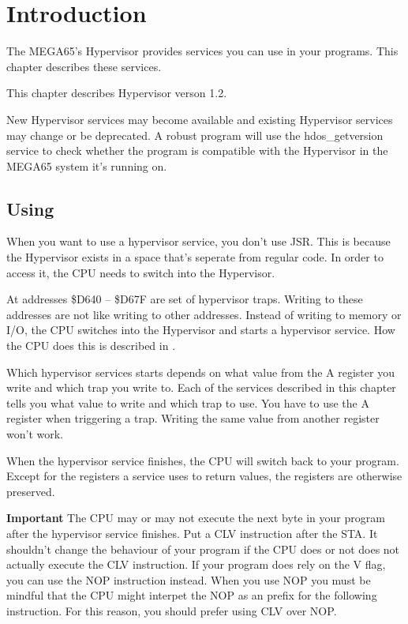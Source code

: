 \section{Introduction}
The MEGA65's Hypervisor provides services you can use in your programs. This
chapter describes these services.

This chapter describes Hypervisor verson 1.2.

New Hypervisor services may become available and existing Hypervisor services
may change or be deprecated. A robust program will use the hdos\_getversion
service to check whether the program is compatible with the Hypervisor in the
MEGA65 system it's running on.


\subsection{Using}
When you want to use a hypervisor service, you don't use JSR. This is because
the Hypervisor exists in a space that's seperate from regular code. In order to
access it, the CPU needs to switch into the Hypervisor.

At addresses \$D640 -- \$D67F are set of hypervisor traps. Writing to these
addresses are not like writing to other addresses. Instead of writing to memory
or I/O, the CPU switches into the Hypervisor and starts a hypervisor service.
How the CPU does this is described in .

Which hypervisor services starts depends on what value from the A register you
write and which trap you write to. Each of the services described in this
chapter tells you what value to write and which trap to use. You have to use the
A register when triggering a trap. Writing the same value from another register
won't work.

When the hypervisor service finishes, the CPU will switch back to your program.
Except for the registers a service uses to return values, the registers are
otherwise preserved.

\textbf{Important} The CPU may or may not execute the next byte in your program
after the hypervisor service finishes. Put a CLV instruction after the STA.
It shouldn't change the behaviour of your program if the CPU does or not does
not actually execute the CLV instruction. If your program does rely on the V
flag, you can use the NOP instruction instead. When you use NOP you must be
mindful that the CPU might interpet the NOP as an prefix for the following
instruction. For this reason, you should prefer using CLV over NOP.

